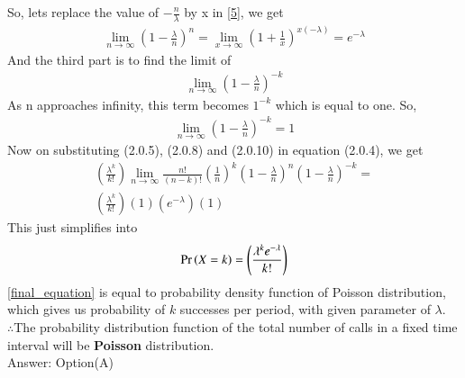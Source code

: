 \documentclass[journal,12pt,twocolumn]{IEEEtran}
\begin{document}
So, lets replace the value of $-\frac{n}{\lambda}$ by x in \ref{5}, we get
\begin{align}
    \lim_{n \to \infty}\left(1-\frac{\lambda}{n}\right)^n =\lim_{x \to \infty}\left(1+\frac{1}{x}\right)^{x(-\lambda)}=e^{-\lambda}
\end{align}
And the third part is to find the limit of 
\begin{align}
    \lim_{n \to \infty}\left(1-\frac{\lambda}{n}\right)^{-k}
\end{align}
As n approaches infinity, this term becomes $1^{-k}$ which is equal to one.
So,
\begin{align}
    \lim_{n \to \infty}\left(1-\frac{\lambda}{n}\right)^{-k}=1
\end{align}
Now on substituting (2.0.5), (2.0.8) and (2.0.10) in equation (2.0.4), we get
\begin{multline}  
    \left(\frac{\lambda^k}{k!}\right)\lim_{n \to \infty}\frac{n!}{(n-k)!}\left(\frac{1}{n}\right)^k\left(1-\frac{\lambda}{n}\right)^n\left(1-\frac{\lambda}{n}\right)^{-k}=\\
    \left(\frac{\lambda^k}{k!}\right)(1)\left(e^{-\lambda}\right)(1)
\end{multline}
This just simplifies into
\begin{align}\label{final_equation}
    \Pr\left(X=k\right)=\left(\frac{\lambda^k e^{-\lambda}}{k!}\right)
\end{align}
   \ref{final_equation} is equal to probability density function of Poisson distribution, which gives us probability of $k$ successes per period, with given parameter of $\lambda$.\\
   
   $\therefore $The probability distribution function of the total
number of calls in a fixed time interval will be \textbf{Poisson} distribution.\\
Answer: Option(A)
\end{document}
